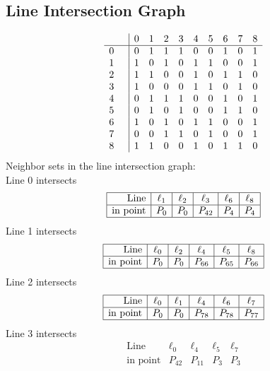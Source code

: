 \documentclass{article}
\begin{document}
{\subsection*{Line Intersection Graph}
{\arraycolsep=1pt
$$
\begin{array}{rr|*{9}r}
 &  & 0 & 1 & 2 & 3 & 4 & 5 & 6 & 7 & 8\\
\hline
0 &  & 0 & 1 & 1 & 1 & 0 & 0 & 1 & 0 & 1\\
1 &  & 1 & 0 & 1 & 0 & 1 & 1 & 0 & 0 & 1\\
2 &  & 1 & 1 & 0 & 0 & 1 & 0 & 1 & 1 & 0\\
3 &  & 1 & 0 & 0 & 0 & 1 & 1 & 0 & 1 & 0\\
4 &  & 0 & 1 & 1 & 1 & 0 & 0 & 1 & 0 & 1\\
5 &  & 0 & 1 & 0 & 1 & 0 & 0 & 1 & 1 & 0\\
6 &  & 1 & 0 & 1 & 0 & 1 & 1 & 0 & 0 & 1\\
7 &  & 0 & 0 & 1 & 1 & 0 & 1 & 0 & 0 & 1\\
8 &  & 1 & 1 & 0 & 0 & 1 & 0 & 1 & 1 & 0\\
\end{array}
$$
}%
Neighbor sets in the line intersection graph:\\
Line 0 intersects 
$$
\begin{array}{|r*{5}{|c}|}
\hline
\mbox{Line}  & \ell_{1} & \ell_{2} & \ell_{3} & \ell_{6} & \ell_{8}\\
\hline
\mbox{in point}  & P_{0} & P_{0} & P_{42} & P_{4} & P_{4}\\
\hline
\end{array}
$$
Line 1 intersects 
$$
\begin{array}{|r*{5}{|c}|}
\hline
\mbox{Line}  & \ell_{0} & \ell_{2} & \ell_{4} & \ell_{5} & \ell_{8}\\
\hline
\mbox{in point}  & P_{0} & P_{0} & P_{66} & P_{65} & P_{66}\\
\hline
\end{array}
$$
Line 2 intersects 
$$
\begin{array}{|r*{5}{|c}|}
\hline
\mbox{Line}  & \ell_{0} & \ell_{1} & \ell_{4} & \ell_{6} & \ell_{7}\\
\hline
\mbox{in point}  & P_{0} & P_{0} & P_{78} & P_{78} & P_{77}\\
\hline
\end{array}
$$
Line 3 intersects 
$$
\begin{array}{|r*{4}{|c}|}
\hline
\mbox{Line}  & \ell_{0} & \ell_{4} & \ell_{5} & \ell_{7}\\
\hline
\mbox{in point}  & P_{42} & P_{11} & P_{3} & P_{3}\\

\end{array}$$}
\end{document}
